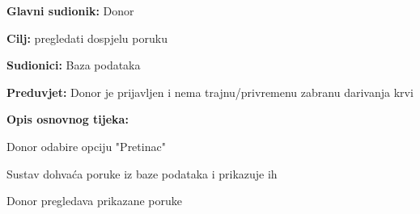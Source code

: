 \noindent {}
					\begin{packed_item}
	
						\item \textbf{Glavni sudionik: }Donor
						\item \textbf{Cilj:} pregledati dospjelu poruku
						\item \textbf{Sudionici:} Baza podataka
						\item \textbf{Preduvjet:} Donor je prijavljen i nema trajnu/privremenu zabranu darivanja krvi
						\item \textbf{Opis osnovnog tijeka:}
						
						\item[] \begin{packed_enum}
	
							\item Donor odabire opciju "Pretinac"
							\item Sustav dohvaća poruke iz baze podataka i prikazuje ih
							\item Donor pregledava prikazane poruke
							
						\end{packed_enum}

					\end{packed_item}


